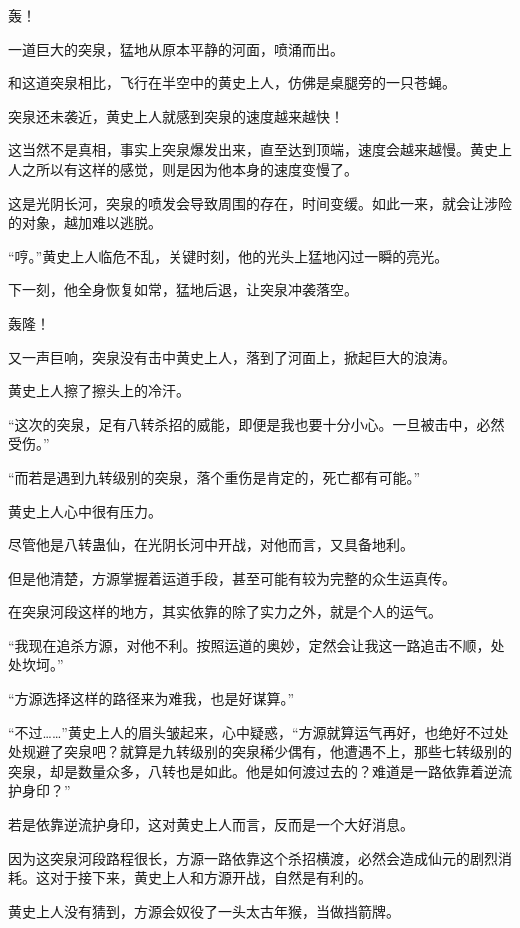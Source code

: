 
\begin{this_body}

轰！

一道巨大的突泉，猛地从原本平静的河面，喷涌而出。

和这道突泉相比，飞行在半空中的黄史上人，仿佛是桌腿旁的一只苍蝇。

突泉还未袭近，黄史上人就感到突泉的速度越来越快！

这当然不是真相，事实上突泉爆发出来，直至达到顶端，速度会越来越慢。黄史上人之所以有这样的感觉，则是因为他本身的速度变慢了。

这是光阴长河，突泉的喷发会导致周围的存在，时间变缓。如此一来，就会让涉险的对象，越加难以逃脱。

“哼。”黄史上人临危不乱，关键时刻，他的光头上猛地闪过一瞬的亮光。

下一刻，他全身恢复如常，猛地后退，让突泉冲袭落空。

轰隆！

又一声巨响，突泉没有击中黄史上人，落到了河面上，掀起巨大的浪涛。

黄史上人擦了擦头上的冷汗。

“这次的突泉，足有八转杀招的威能，即便是我也要十分小心。一旦被击中，必然受伤。”

“而若是遇到九转级别的突泉，落个重伤是肯定的，死亡都有可能。”

黄史上人心中很有压力。

尽管他是八转蛊仙，在光阴长河中开战，对他而言，又具备地利。

但是他清楚，方源掌握着运道手段，甚至可能有较为完整的众生运真传。

在突泉河段这样的地方，其实依靠的除了实力之外，就是个人的运气。

“我现在追杀方源，对他不利。按照运道的奥妙，定然会让我这一路追击不顺，处处坎坷。”

“方源选择这样的路径来为难我，也是好谋算。”

“不过……”黄史上人的眉头皱起来，心中疑惑，“方源就算运气再好，也绝好不过处处规避了突泉吧？就算是九转级别的突泉稀少偶有，他遭遇不上，那些七转级别的突泉，却是数量众多，八转也是如此。他是如何渡过去的？难道是一路依靠着逆流护身印？”

若是依靠逆流护身印，这对黄史上人而言，反而是一个大好消息。

因为这突泉河段路程很长，方源一路依靠这个杀招横渡，必然会造成仙元的剧烈消耗。这对于接下来，黄史上人和方源开战，自然是有利的。

黄史上人没有猜到，方源会奴役了一头太古年猴，当做挡箭牌。


\end{this_body}
